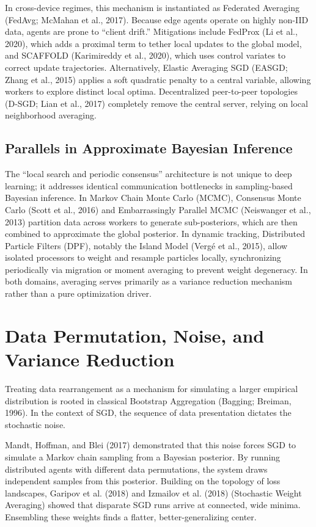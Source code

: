 \documentclass[11pt]{article}
\begin{document}
In cross-device regimes, this mechanism is instantiated as Federated Averaging (FedAvg; McMahan et al., 2017). Because edge agents operate on highly non-IID data, agents are prone to ``client drift.'' Mitigations include FedProx (Li et al., 2020), which adds a proximal term to tether local updates to the global model, and SCAFFOLD (Karimireddy et al., 2020), which uses control variates to correct update trajectories. Alternatively, Elastic Averaging SGD (EASGD; Zhang et al., 2015) applies a soft quadratic penalty to a central variable, allowing workers to explore distinct local optima. Decentralized peer-to-peer topologies (D-SGD; Lian et al., 2017) completely remove the central server, relying on local neighborhood averaging.

\subsection{Parallels in Approximate Bayesian Inference}
The ``local search and periodic consensus'' architecture is not unique to deep learning; it addresses identical communication bottlenecks in sampling-based Bayesian inference. 
In Markov Chain Monte Carlo (MCMC), Consensus Monte Carlo (Scott et al., 2016) and Embarrassingly Parallel MCMC (Neiswanger et al., 2013) partition data across workers to generate sub-posteriors, which are then combined to approximate the global posterior. In dynamic tracking, Distributed Particle Filters (DPF), notably the Island Model (Vergé et al., 2015), allow isolated processors to weight and resample particles locally, synchronizing periodically via migration or moment averaging to prevent weight degeneracy. In both domains, averaging serves primarily as a variance reduction mechanism rather than a pure optimization driver.

\section{Data Permutation, Noise, and Variance Reduction}
Treating data rearrangement as a mechanism for simulating a larger empirical distribution is rooted in classical Bootstrap Aggregation (Bagging; Breiman, 1996). In the context of SGD, the sequence of data presentation dictates the stochastic noise. 

Mandt, Hoffman, and Blei (2017) demonstrated that this noise forces SGD to simulate a Markov chain sampling from a Bayesian posterior. By running distributed agents with different data permutations, the system draws independent samples from this posterior. Building on the topology of loss landscapes, Garipov et al. (2018) and Izmailov et al. (2018) (Stochastic Weight Averaging) showed that disparate SGD runs arrive at connected, wide minima. Ensembling these weights finds a flatter, better-generalizing center. 
\end{document}
